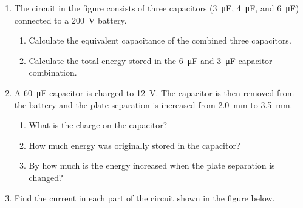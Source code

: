 \documentclass{../../oss-apphys}
\begin{document}
\begin{enumerate}[leftmargin=15pt]

\item The circuit in the figure consists of three capacitors
  (\SI{3}{\micro\farad}, \SI{4}{\micro\farad}, and \SI{6}{\micro\farad})
  connected to a \SI{200}{\volt} battery.
  
  \begin{minipage}{0.3\textwidth}
  \end{minipage}
  \begin{minipage}{.68\textwidth}
    \begin{enumerate}[noitemsep]
    \item Calculate the equivalent capacitance of the combined three
      capacitors.
    \item Calculate the total energy stored in the \SI{6}{\micro\farad} and
      \SI{3}{\micro\farad} capacitor combination.
    \end{enumerate}
  \end{minipage}
  \vspace{1.5in}
  
\item A \SI{60}{\micro\farad} capacitor is charged to \SI{12}{\volt}. The
  capacitor is then removed from the battery and the plate separation is
  increased from \SI{2.0}{mm} to \SI{3.5}{mm}.
  \begin{enumerate}[noitemsep]
  \item What is the charge on the capacitor?
  \item How much energy was originally stored in the capacitor?
  \item By how much is the energy increased when the plate separation is
    changed?
  \end{enumerate}
  \newpage

\item Find the current in each part of the circuit shown in the figure below.
  \begin{center}
  \end{center}
  \newpage
  

\end{enumerate}
\end{document}
